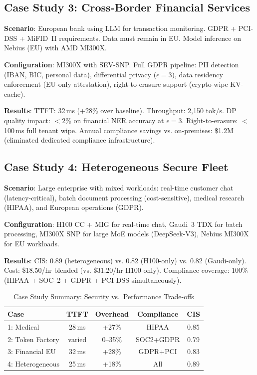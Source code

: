 \documentclass[conference,10pt]{IEEEtran}
\begin{document}
\subsection{Case Study 3: Cross-Border Financial Services}

\textbf{Scenario}: European bank using LLM for transaction monitoring. GDPR + PCI-DSS + MiFID~II requirements. Data must remain in EU. Model inference on Nebius (EU) with AMD MI300X.

\textbf{Configuration}: MI300X with SEV-SNP. Full GDPR pipeline: PII detection (IBAN, BIC, personal data), differential privacy ($\epsilon=3$), data residency enforcement (EU-only attestation), right-to-erasure support (crypto-wipe KV-cache).

\textbf{Results}: TTFT: 32\,ms (+28\% over baseline). Throughput: 2,150 tok/s. DP quality impact: $<$2\% on financial NER accuracy at $\epsilon=3$. Right-to-erasure: $<$100\,ms full tenant wipe. Annual compliance savings vs. on-premises: \$1.2M (eliminated dedicated compliance infrastructure).

\subsection{Case Study 4: Heterogeneous Secure Fleet}

\textbf{Scenario}: Large enterprise with mixed workloads: real-time customer chat (latency-critical), batch document processing (cost-sensitive), medical research (HIPAA), and European operations (GDPR).

\textbf{Configuration}: H100 CC + MIG for real-time chat, Gaudi~3 TDX for batch processing, MI300X SNP for large MoE models (DeepSeek-V3), Nebius MI300X for EU workloads.

\textbf{Results}: CIS: 0.89 (heterogeneous) vs. 0.82 (H100-only) vs. 0.82 (Gaudi-only). Cost: \$18.50/hr blended (vs. \$31.20/hr H100-only). Compliance coverage: 100\% (HIPAA + SOC~2 + GDPR + PCI-DSS simultaneously).

\begin{table}[!htbp]
\caption{Case Study Summary: Security vs.\ Performance Trade-offs}
\label{tab:casesummary}
\centering\footnotesize
\begin{tabular}{@{}lcccc@{}}
\toprule
\textbf{Case} & \textbf{TTFT} & \textbf{Overhead} & \textbf{Compliance} & \textbf{CIS} \\
\midrule
1: Medical & 28\,ms & +27\% & HIPAA & 0.85 \\
2: Token Factory & varied & 0--35\% & SOC2+GDPR & 0.79 \\
3: Financial EU & 32\,ms & +28\% & GDPR+PCI & 0.83 \\
4: Heterogeneous & 25\,ms & +18\% & All & 0.89 \\
\bottomrule
\end{tabular}
\end{table}
\end{document}
